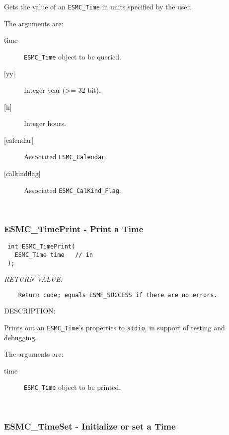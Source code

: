   
    Gets the value of an {\tt ESMC\_Time} in units specified by the user.
  
    The arguments are:
    \begin{description}
    \item[time]
      {\tt ESMC\_Time} object to be queried.
    \item[{[yy]}]
      Integer year (>= 32-bit).
    \item[{[h]}]
      Integer hours.
    \item[{[calendar]}]
      Associated {\tt ESMC\_Calendar}.
    \item[{[calkindflag]}]
      Associated {\tt ESMC\_CalKind\_Flag}.
    \end{description}
   
 
\mbox{}\hrulefill\ 
 
\subsubsection [ESMC\_TimePrint] {ESMC\_TimePrint - Print a Time}


  
\begin{verbatim} int ESMC_TimePrint(
   ESMC_Time time   // in
 );
 \end{verbatim}{\em RETURN VALUE:}
\begin{verbatim}    Return code; equals ESMF_SUCCESS if there are no errors.\end{verbatim}
{\sf DESCRIPTION:\\ }


    Prints out an {\tt ESMC\_Time}'s properties to {\tt stdio}, 
    in support of testing and debugging.
  
    The arguments are:
    \begin{description}
    \item[time]
      {\tt ESMC\_Time} object to be printed.
    \end{description}
   
 
\mbox{}\hrulefill\ 
 
\subsubsection [ESMC\_TimeSet] {ESMC\_TimeSet - Initialize or set a Time}


